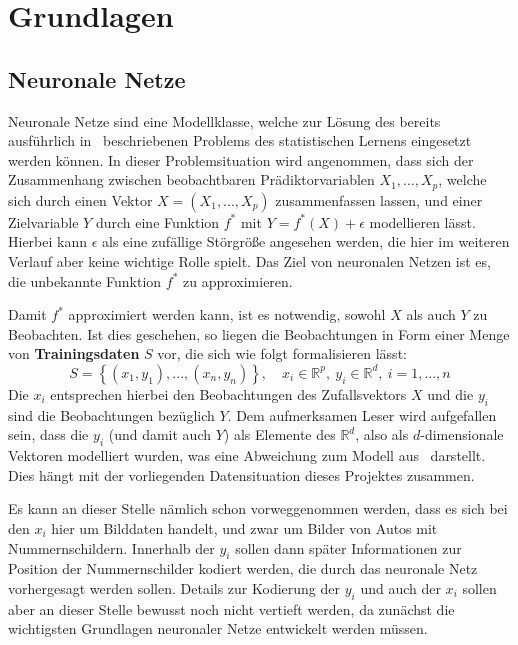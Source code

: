 \section{Grundlagen}
\label{sec:grundlagen}

\subsection{Neuronale Netze}
\label{sec:neuronale-netze}

Neuronale Netze sind eine Modellklasse, welche zur L\"osung des
bereits ausf\"uhrlich
in~\cite{statistical_learning} beschriebenen Problems des statistischen
Lernens eingesetzt werden k\"onnen.
In dieser Problemsituation wird angenommen, dass sich der Zusammenhang zwischen
beobachtbaren Pr\"adiktorvariablen $X_1, ..., X_p$, welche sich durch
einen Vektor $X = (X_1, ..., X_p)$ zusammenfassen lassen, und einer
Zielvariable $Y$ durch eine Funktion $f^*$ mit $Y = f^*(X) + \epsilon$
modellieren l\"asst. Hierbei kann $\epsilon$ als eine zuf\"allige
St\"orgr\"o{\ss}e angesehen werden, die hier im weiteren Verlauf aber
keine wichtige Rolle spielt.
Das Ziel von neuronalen Netzen ist es, die unbekannte Funktion $f^*$
zu approximieren.

Damit $f^*$ approximiert werden kann, ist es notwendig, sowohl $X$
als auch $Y$ zu Beobachten. Ist dies geschehen, so liegen die
Beobachtungen in Form einer Menge von \textbf{Trainingsdaten}
$S$ vor, die sich wie folgt formalisieren l\"asst:
\begin{equation}
    \label{eq:trainingsdaten}
    S = \left\{ (x_1, y_1), ..., (x_n, y_n) \right\},
    \quad x_i \in \mathbb{R}^p, \  y_i \in \mathbb{R}^d, \  i=1, ..., n
\end{equation}
Die $x_i$ entsprechen hierbei den Beobachtungen des Zufallsvektors $X$
und die $y_i$ sind die Beobachtungen bez\"uglich $Y$.
Dem aufmerksamen Leser wird aufgefallen sein, dass die $y_i$ (und damit auch $Y$)
als Elemente des $\mathbb{R}^d$, also als $d$-dimensionale Vektoren
modelliert wurden, was eine Abweichung zum Modell aus~\cite{statistical_learning}
darstellt. Dies h\"angt mit der vorliegenden Datensituation dieses
Projektes zusammen.

Es kann an dieser Stelle n\"amlich schon vorweggenommen werden, dass es sich bei den
$x_i$ hier um Bilddaten handelt, und zwar um Bilder von Autos
mit Nummernschildern. Innerhalb der $y_i$ sollen dann sp\"ater
Informationen zur Position der Nummernschilder kodiert werden,
die durch das neuronale Netz vorhergesagt werden sollen.
Details zur Kodierung der $y_i$ und auch der $x_i$ sollen aber
an dieser Stelle bewusst noch
nicht vertieft werden, da zun\"achst die wichtigsten Grundlagen neuronaler
Netze entwickelt werden m\"ussen.

